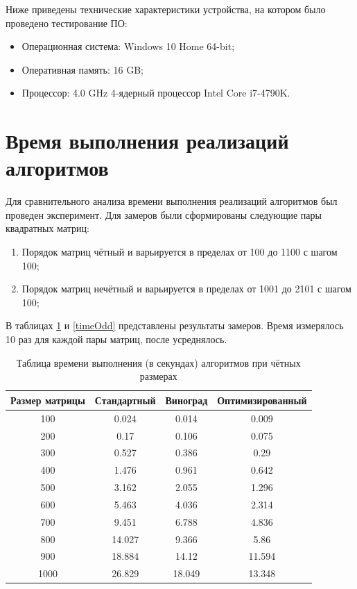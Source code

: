 \documentclass[12pt]{report}
\begin{document}
Ниже приведены технические характеристики устройства, на котором было проведено тестирование ПО:

\begin{itemize}
	\item Операционная система: Windows 10 Home 64-bit;
	\item Оперативная память: 16 GB;
	\item Процессор: 4.0 GHz 4‑ядерный процессор Intel Core i7-4790K.

\end{itemize}

\section{Время выполнения реализаций алгоритмов}

Для сравнительного анализа времени выполнения реализаций алгоритмов был проведен эксперимент. Для замеров были сформированы следующие пары квадратных матриц:
\begin{enumerate}
	\item Порядок матриц чётный и варьируется в пределах от 100 до 1100 с шагом 100;
	\item Порядок матриц нечётный и варьируется в пределах от 1001 до 2101 с шагом 100;
\end{enumerate}

В таблицах \ref{timeEven} и \ref{timeOdd} представлены результаты замеров. Время измерялось 10 раз для каждой пары матриц, после усреднялось. 

\begin{table} [H]
	\label{timeEven}
	\caption{Таблица времени выполнения (в секундах) алгоритмов при чётных размерах}
	\begin{center}
		\begin{tabular}{|c c c c|} 
			\hline
			Размер матрицы & Стандартный & Виноград & Оптимизированный \\  
			\hline
			100 & 0.024 & 0.014 & 0.009 \\
			\hline
			200 & 0.17 & 0.106 & 0.075 \\
			\hline
			300 & 0.527 & 0.386 & 0.29 \\
			\hline
			400 & 1.476 & 0.961 & 0.642 \\
			\hline
			500 & 3.162 & 2.055 & 1.296 \\
			\hline
			600 & 5.463 & 4.036 & 2.314 \\
			\hline
			700 & 9.451 & 6.788 & 4.836 \\
			\hline
			800 & 14.027 & 9.366 & 5.86 \\
			\hline
			900 & 18.884 & 14.12 & 11.594 \\
			\hline
			1000 & 26.829 & 18.049 & 13.348 \\
			\hline
		\end{tabular}
	\end{center}
\end{table}
\end{document}
